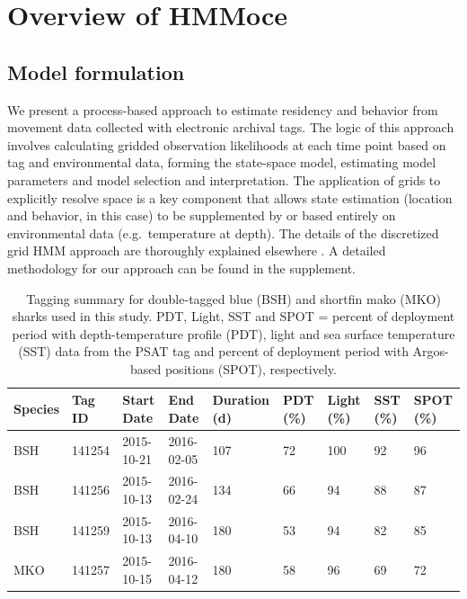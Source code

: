 \section{Overview of HMMoce}

\subsection{Model formulation}

We present a process-based approach to estimate residency and behavior
from movement data collected with electronic archival tags. The logic of
this approach involves calculating gridded observation likelihoods at
each time point based on tag and environmental data, forming the
state-space model, estimating model parameters and model selection and
interpretation. The application of grids to explicitly resolve space is
a key component that allows state estimation (location and behavior, in
this case) to be supplemented by or based entirely on environmental data
(e.g.~temperature at depth). The details of the discretized grid HMM
approach are thoroughly explained elsewhere
\citep[e.g.][]{Thygesen2009a, Pedersen2011}. A detailed methodology for
our approach can be found in the supplement.

\begin{table}[b] %
\centering
\caption[Satellite tagging summary for model data]{Tagging summary for double-tagged blue (BSH) and shortfin mako (MKO) sharks used in this study. PDT, Light, SST and SPOT = percent of deployment period with depth-temperature profile (PDT), light and sea surface temperature (SST) data from the PSAT tag and percent of deployment period with Argos-based positions (SPOT), respectively.}
\label{tab:c2t1}
\small
\begin{tabular}{p{1.25cm} p{1.25cm} p{2cm} p{2cm} p{1.5cm} p{1.25cm} p{1cm} p{1cm} p{1cm}}
\toprule
\textbf{Species} & \textbf{Tag ID} & \textbf{Start Date} & \textbf{End Date} & \textbf{Duration (d)} & \textbf{PDT (\%)} & \textbf{Light (\%)} & \textbf{SST (\%)} & \textbf{SPOT (\%)}\\
\midrule
BSH & 141254 & 2015-10-21 & 2016-02-05 & 107 & 72 & 100 & 92 & 96\\
BSH & 141256 & 2015-10-13 & 2016-02-24 & 134 & 66 & 94 & 88 & 87\\
BSH & 141259 & 2015-10-13 & 2016-04-10 & 180 & 53 & 94 & 82 & 85\\
MKO & 141257 & 2015-10-15 & 2016-04-12 & 180 & 58 & 96 & 69 & 72\\
\bottomrule
\end{tabular}
\end{table}

